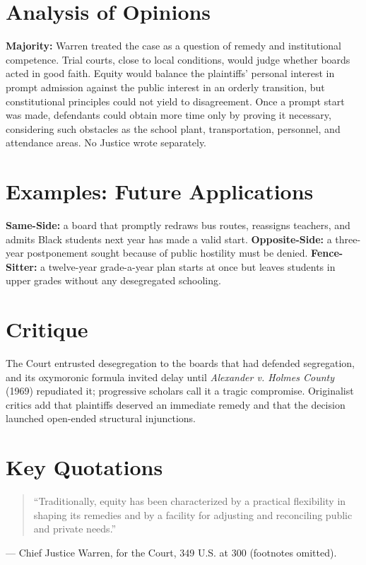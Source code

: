 \documentclass[12pt]{article}
\begin{document}
\section{Analysis of Opinions}
\textbf{Majority:} Warren treated the case as a question of remedy and institutional competence. Trial courts, close to local conditions, would judge whether boards acted in good faith. Equity would balance the plaintiffs' personal interest in prompt admission against the public interest in an orderly transition, but constitutional principles could not yield to disagreement. Once a prompt start was made, defendants could obtain more time only by proving it necessary, considering such obstacles as the school plant, transportation, personnel, and attendance areas. No Justice wrote separately.

\section{Examples: Future Applications}
\textbf{Same-Side:} a board that promptly redraws bus routes, reassigns teachers, and admits Black students next year has made a valid start. \textbf{Opposite-Side:} a three-year postponement sought because of public hostility must be denied. \textbf{Fence-Sitter:} a twelve-year grade-a-year plan starts at once but leaves students in upper grades without any desegregated schooling.

\section{Critique}
The Court entrusted desegregation to the boards that had defended segregation, and its oxymoronic formula invited delay until \textit{Alexander v. Holmes County} (1969) repudiated it; progressive scholars call it a tragic compromise. Originalist critics add that plaintiffs deserved an immediate remedy and that the decision launched open-ended structural injunctions.

\section{Key Quotations}
\begin{quote}
``Traditionally, equity has been characterized by a practical flexibility in shaping its remedies and by a facility for adjusting and reconciling public and private needs.''
\end{quote}
\noindent --- Chief Justice Warren, for the Court, 349 U.S. at 300 (footnotes omitted).
\end{document}
